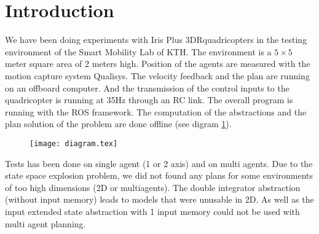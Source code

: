 \section{Introduction}
We have been doing experiments with Iris Plus 3DR\trademark quadricopters in the testing environment of the Smart Mobility Lab of KTH.
The environment is a $5\times5$ meter square area of 2 meters high.
Position of the agents are measured with the motion capture system Qualisys\trademark.
The velocity feedback and the plan are running on an offboard computer. And the transmission of the control inputs to the quadricopter is running at 35Hz through an RC link. The overall program is running with the ROS framework.
The computation of the abstractions and the plan solution of the problem are done offline (see digram \ref{diagram}).

\begin{figure}
\texttt{[image: diagram.tex]}
\label{diagram}
\end{figure}

Tests has been done on single agent (1 or 2 axis) and on multi agents.
Due to the state space explosion problem, we did not found any plans for some environments of too high dimensions (2D or multiagents).
The double integrator abstraction (without input memory) leads to models that were unusable in 2D. As well as the input extended state abstraction with 1 input memory could not be used with multi agent planning.
